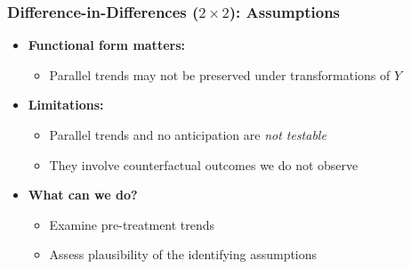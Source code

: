 \documentclass[12pt, compress]{beamer}
\begin{document}
\begin{frame}
	\frametitle{Difference-in-Differences ($2 \times 2$): Assumptions}

\begin{itemize}
	\item \textbf{Functional form matters:}
	\begin{itemize}
		\item Parallel trends may not be preserved under transformations of $Y$
	\end{itemize}
	
	\medskip
	
	\item \textbf{Limitations:}
	\begin{itemize}
		\item Parallel trends and no anticipation are \textit{not testable}
		\item They involve counterfactual outcomes we do not observe
	\end{itemize}
	
	\medskip
	
	\item \textbf{What can we do?}
	\begin{itemize}
		\item Examine pre-treatment trends
		\item Assess plausibility of the identifying assumptions
	\end{itemize}
\end{itemize}
\end{frame}
\end{document}
